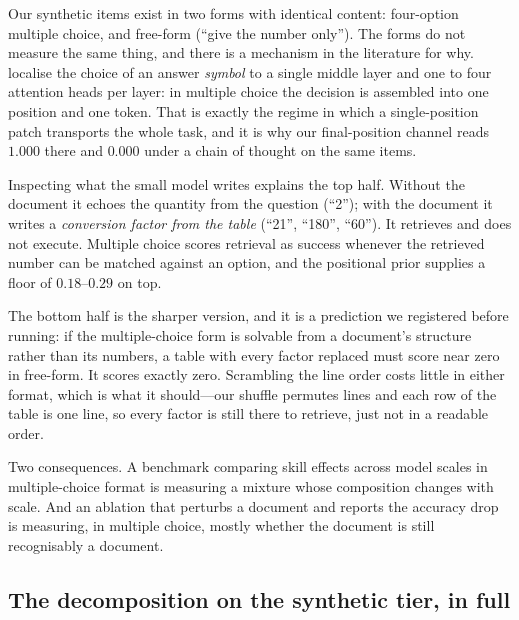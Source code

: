 \documentclass{article}
\begin{document}
Our synthetic items exist in two forms with identical content: four-option
multiple choice, and free-form (``give the number only''). The forms do not
measure the same thing, and there is a mechanism in the literature for why.
\citet{wiegreffe2025mcq} localise the choice of an answer \emph{symbol} to a
single middle layer and one to four attention heads per layer: in multiple
choice the decision is assembled into one position and one token. That is
exactly the regime in which a single-position patch transports the whole task,
and it is why our final-position channel reads $1.000$ there and $0.000$ under a
chain of thought on the same items.



Inspecting what the small model writes explains the top half. Without the
document it echoes the quantity from the question (``2''); with the document it
writes a \emph{conversion factor from the table} (``21'', ``180'', ``60''). It
retrieves and does not execute. Multiple choice scores retrieval as success
whenever the retrieved number can be matched against an option, and the
positional prior supplies a floor of $0.18$--$0.29$ on top.

The bottom half is the sharper version, and it is a prediction we registered
before running: if the multiple-choice form is solvable from a document's
structure rather than its numbers, a table with every factor replaced must score
near zero in free-form. It scores exactly zero. Scrambling the line order costs
little in either format, which is what it should---our shuffle permutes lines and
each row of the table is one line, so every factor is still there to retrieve,
just not in a readable order.

Two consequences. A benchmark comparing skill effects across model scales in
multiple-choice format is measuring a mixture whose composition changes with
scale. And an ablation that perturbs a document and reports the accuracy drop is
measuring, in multiple choice, mostly whether the document is still recognisably
a document.

\subsection{The decomposition on the synthetic tier, in full}
\label{app:decomp}
\end{document}
